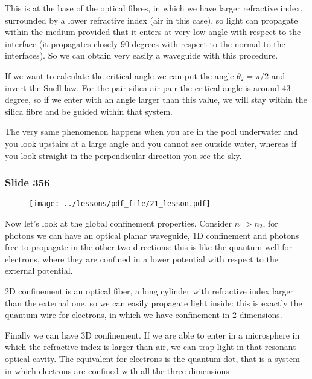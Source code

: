 \documentclass[../main/main.tex]{subfiles}
\begin{document}
This is at the base of the optical fibres, in which we have larger refractive index, surrounded by a lower refractive index (air in this case), so light can propagate within the medium provided that it enters at very low angle with respect to the interface (it propagates closely 90 degrees with respect to the normal to the interfaces). So we can obtain very easily a waveguide with this procedure.

If we want to calculate the critical angle we can put the angle $\theta_2 = \pi /2$ and invert the Snell law. For the pair silica-air pair the critical angle is around 43 degree, so if we enter with an angle larger than this value, we will stay within the silica fibre and be guided within that system.

The very same phenomenon happens when you are in the pool underwater and you look upstairs at a large angle and you cannot see outside water, whereas if you look straight in the perpendicular direction you see the sky.

\newpage

\subsubsection{Slide 356}

\begin{figure}[h!]
\centering
\texttt{[image: ../lessons/pdf\_file/21\_lesson.pdf]}
\end{figure}


Now let’s look at the global confinement properties.
Consider $n_1 > n_2$, for photons we can have an optical planar waveguide, 1D confinement and photons free to propagate in the other two directions: this is like the quantum well for electrons, where they are confined in a lower potential with respect to the external potential. 

2D confinement is an optical fiber, a long cylinder with refractive index larger than the external one, so we can easily propagate light inside: this is exactly the quantum wire for electrons, in which we have confinement in 2 dimensions.

Finally we can have 3D confinement. If we are able to enter in a microsphere in which the refractive index is larger than air, we can trap light in that resonant optical cavity. The equivalent for electrons is the quantum dot, that is a system in which electrons are confined with all the three dimensions


\newpage
\end{document}
